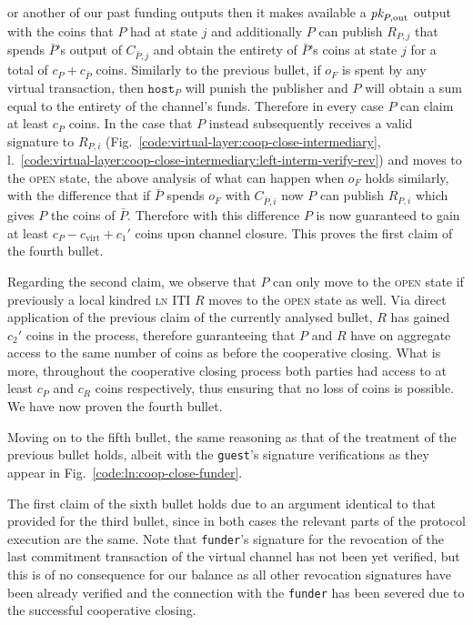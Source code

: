   or another of our past funding outputs then it makes available a $\textit{pk}_{P,
  \mathrm{out}}$ output with the coins that $P$ had at state $j$ and
  additionally $P$ can publish $R_{P, j}$ that spends $\bar{P}$'s output of
  $C_{\bar{P}, j}$ and obtain the entirety of $\bar{P}$'s coins at state $j$ for
  a total of $c_P + c_{\bar{P}}$ coins. Similarly to the previous bullet, if
  $o_F$ is spent by any virtual transaction, then $\texttt{host}_P$ will punish
  the publisher and $P$ will obtain a sum equal to the entirety of the channel's
  funds. Therefore in every case $P$ can claim at least $c_P$ coins. In the case
  that $P$ instead subsequently receives a valid signature to $R_{P, i}$
  (Fig.~\ref{code:virtual-layer:coop-close-intermediary},
  l.~\ref{code:virtual-layer:coop-close-intermediary:left-interm-verify-rev})
  and moves to the \textsc{open} state, the above analysis of what can happen
  when $o_F$ holds similarly, with the difference that if $\bar{P}$ spends $o_F$
  with $C_{\bar{P}, i}$ now $P$ can publish $R_{P, i}$ which gives $P$ the coins
  of $\bar{P}$. Therefore with this difference $P$ is now guaranteed to gain at
  least $c_P - c_{\mathrm{virt}} + c_1'$ coins upon channel closure. This proves
  the first claim of the fourth bullet.

  Regarding the second claim, we observe that $P$ can only move to the
  \textsc{open} state if previously a local kindred \textsc{ln} ITI $R$ moves to
  the \textsc{open} state as well. Via direct application of the previous claim
  of the currently analysed bullet, $R$ has gained $c_2'$ coins in the process,
  therefore guaranteeing that $P$ and $R$ have on aggregate access to the same
  number of coins as before the cooperative closing. What is more, throughout
  the cooperative closing process both parties had access to at least $c_P$ and
  $c_R$ coins respectively, thus ensuring that no loss of coins is possible. We
  have now proven the fourth bullet.

  Moving on to the fifth bullet, the same reasoning as that of the treatment of
  the previous bullet holds, albeit with the \texttt{guest}'s signature
  verifications as they appear in Fig.~\ref{code:ln:coop-close-funder}.

  The first claim of the sixth bullet holds due to an argument identical to that
  provided for the third bullet, since in both cases the relevant parts of the
  protocol execution are the same. Note that \texttt{funder}'s signature for the
  revocation of the last commitment transaction of the virtual channel has not
  been yet verified, but this is of no consequence for our balance as all other
  revocation signatures have been already verified and the connection with the
  \texttt{funder} has been severed due to the successful cooperative closing.

